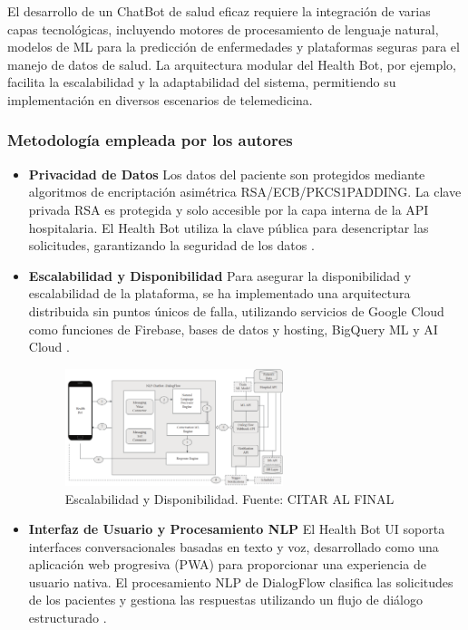		El desarrollo de un ChatBot de salud eficaz requiere la integración de varias capas tecnológicas, incluyendo motores de procesamiento de lenguaje natural, modelos de ML para la predicción de enfermedades y plataformas seguras para el manejo de datos de salud. La arquitectura modular del Health Bot, por ejemplo, facilita la escalabilidad y la adaptabilidad del sistema, permitiendo su implementación en diversos escenarios de telemedicina.
	
	\subsubsection{Metodología empleada por los autores}	
		\begin{itemize}
				\item \textbf {Privacidad de Datos}
				Los datos del paciente son protegidos mediante algoritmos de encriptación asimétrica RSA/ECB/PKCS1PADDING. La clave privada RSA es protegida y solo accesible por la capa interna de la API hospitalaria. El Health Bot utiliza la clave pública para desencriptar las solicitudes, garantizando la seguridad de los datos .
		
				\item \textbf {Escalabilidad y Disponibilidad}
				Para asegurar la disponibilidad y escalabilidad de la plataforma, se ha implementado una arquitectura distribuida sin puntos únicos de falla, utilizando servicios de Google Cloud como funciones de Firebase, bases de datos y hosting, BigQuery ML y AI Cloud .
		
					\begin{figure}[h]
						\begin{center}
							\includegraphics[width=0.6\textwidth]{2/1_antecedentes/Escalabilidad y Disponibilidad.png}
							\caption{Escalabilidad y Disponibilidad. Fuente: CITAR AL FINAL }
						\end{center}
					\end{figure}
		
	
				\item \textbf {Interfaz de Usuario y Procesamiento NLP}
				El Health Bot UI soporta interfaces conversacionales basadas en texto y voz, desarrollado como una aplicación web progresiva (PWA) para proporcionar una experiencia de usuario nativa. El procesamiento NLP de DialogFlow clasifica las solicitudes de los pacientes y gestiona las respuestas utilizando un flujo de diálogo estructurado .
		

\end{itemize}
